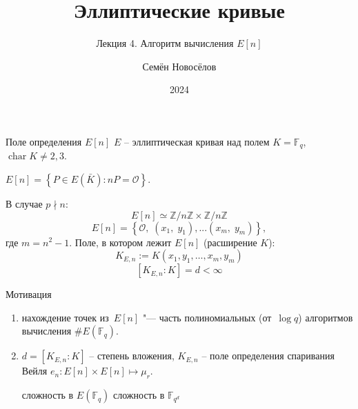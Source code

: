 \documentclass{beamer}
\title{Эллиптические кривые}
\subtitle{Лекция 4. Алгоритм вычисления $E[n]$}
\author{Семён Новосёлов}
\institute{БФУ им. И. Канта}
\date{2024}
\begin{document}
\frame{\titlepage}

\begin{frame}{Поле определения $E[n]$}
$E$ -- эллиптическая кривая над полем $K = \mathbb{F}_q$, $\operatorname{char}{K} \ne 2,3$.

\vspace{0.5em}
     $E[n] = \left\{ {P \in E\left( \bar{K} \right) : nP = \mathcal{O}} \right\}$.

    В случае $p \nmid n$:
    \[
    E\left[ n \right] \simeq \mathbb{Z}/n\mathbb{Z} \times \mathbb{Z}/n\mathbb{Z}
    \]
    \structure{
    \[\Downarrow\]
	}
    \[
    E\left[n\right] = \left\{ {\mathcal{O},\;\left( {{x_1},\;{y_1}} \right), ... \left( {{x_m},\;{y_m}} \right)} \right\},
    \]
    где $m=n^2-1$.
    \structure{
    \[\Downarrow\]
	}
    Поле, в котором лежит $E\left[ n \right]$ (расширение
    $K$):
    \[
    K_{E,n} := K\left( {{x_1}, {y_1}, \ldots, x_m, y_m} \right)
    \]
    \[
    \left[ K_{E,n} : K \right] = d < \infty 
    \]
\end{frame}

\begin{frame}{Мотивация}
    \begin{enumerate}
        \item нахождение точек из~$E[n]$ "--- часть полиномиальных (от~$\log{q}$) алгоритмов вычисления $\#E(\mathbb{F}_q)$.
        \item $d = [K_{E,n} : K]$ -- степень вложения, $K_{E,n}$ -- поле определения спаривания Вейля $e_n: E[n] \times E[n] \mapsto \mu_r$.
        \begin{center}
            \structure{$\Downarrow$}
        \end{center}
            сложность  в $E(\mathbb{F}_q)$ \structure{$\rightleftarrows$} сложность  в $\mathbb{F}_{q^{d}}$
    \end{enumerate}
\end{frame}
\end{document}

